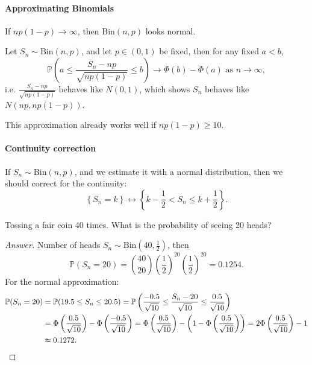 \paragraph{Approximating Binomials}
If \(np(1 - p) \to \infty\), then \(\mathrm{Bin}(n, p)\) looks normal. 

\begin{theorem}
    Let \(S_n \sim \mathrm{Bin}(n, p)\), and let \(p \in (0, 1)\) be fixed, then for any fixed \(a < b\), 
    \[
        \mathbb{P} \left( a \le \frac{S_n - np}{\sqrt{np(1 - p)} } \le b \right) \to \Phi (b) - \Phi (a) \text{ as } n \to \infty, 
    \]   
    i.e. \(\frac{S_n - np}{\sqrt{np(1 - p)} }\) behaves like \(N(0, 1)\), which shows \(S_n\) behaves like \(N(np, np(1 - p))\).    
\end{theorem}

\begin{remark}
    This approximation already works well if \(np(1 - p) \ge 10\). 
\end{remark}

\paragraph{Continuity correction}

If \(S_n \sim \mathrm{Bin}(n, p) \), and we estimate it with a normal distribution, then we should correct for the continuity: 
\[
    \left\{ S_n = k \right\} \leftrightarrow \left\{ k  - \frac{1}{2} < S_n \le k + \frac{1}{2} \right\}.  
\]

\begin{eg}
    Tossing a fair coin 40 times. What is the probability of seeing 20 heads?
\end{eg}
\begin{proof}[Answer]
    Number of heads \(S_n \sim \mathrm{Bin}\left( 40, \frac{1}{2} \right)  \), then 
    \[
        \mathbb{P} (S_n = 20) = \binom{40}{20} \left( \frac{1}{2} \right)^{20} \left( \frac{1}{2} \right)^{20} = 0.1254.   
    \] 
    For the normal approximation:
    \begin{align*}
        \mathbb{P} (S_n = 20) &= \mathbb{P} (19.5 \le S_n \le 20.5) = \mathbb{P} \left( \frac{-0.5}{\sqrt{10} } \le \frac{S_n - 20}{\sqrt{10} } \le \frac{0.5}{\sqrt{10} } \right) \\
        &= \Phi \left( \frac{0.5}{\sqrt{10} } \right) - \Phi \left( \frac{-0.5}{\sqrt{10} } \right) = \Phi \left( \frac{0.5}{\sqrt{10} } \right) - \left( 1 - \Phi \left( \frac{0.5}{\sqrt{10} } \right) \right) = 2 \Phi \left( \frac{0.5}{\sqrt{10} } \right) - 1 \\ 
        &\thickapprox 0.1272.   
    \end{align*}
\end{proof}

